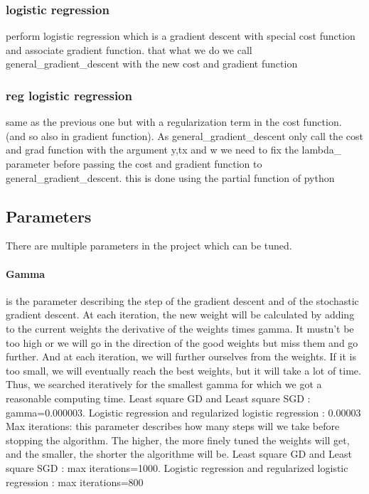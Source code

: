 \documentclass[10pt,conference,compsocconf]{IEEEtran}
\begin{document}
\subsubsection{logistic regression}

perform logistic regression which is a gradient descent with special cost function and associate gradient function. that what we do we call general\_gradient\_descent with the new cost and gradient function 

\subsubsection{reg logistic regression}
same as the previous one but with a regularization term in the cost function. (and so also in gradient function). As general\_gradient\_descent only call the cost and grad function with the argument y,tx and w we need to fix the lambda\_ parameter before passing the cost and gradient function to general\_gradient\_descent. this is done using the partial function of python

\subsection{Parameters}
There are multiple parameters in the project which can be tuned. 
\paragraph{Gamma} is the parameter describing the step of the gradient descent and of the stochastic gradient descent. At each iteration, the new weight will be calculated by adding to the current weights the derivative of the weights times gamma. It mustn’t be too high or we will go in the direction of the good weights but miss them and go further. And at each iteration, we will further ourselves from the weights. If it is too small, we will eventually reach the best weights, but it will take a lot of time. Thus, we searched iteratively for the smallest gamma for which we got a reasonable computing time.
Least square GD and Least square SGD : gamma=0.000003.
Logistic regression and regularized logistic regression : 0.00003
Max iterations: this parameter describes how many steps will we take before stopping the algorithm. The higher, the more finely tuned the weights will get, and the smaller, the shorter the algorithme will be. 
Least square GD and Least square SGD : max iterations=1000.
Logistic regression and regularized logistic regression :  max iterations=800
\end{document}
